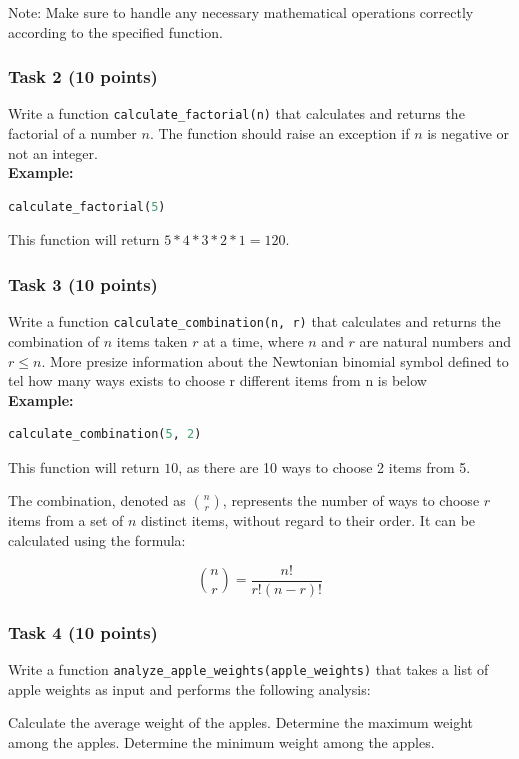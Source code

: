 \documentclass[12pt]{book}
\begin{document}
Note: Make sure to handle any necessary mathematical operations correctly according to the specified function.

\subsubsection{Task 2 (10 points)}
Write a function \texttt{calculate\_factorial(n)} that calculates and returns the factorial of a number $n$. The function should raise an exception if $n$ is negative or not an integer. \\
\textbf{Example:}
\begin{lstlisting}[language=Python]
calculate_factorial(5)
\end{lstlisting}
This function will return $5*4*3*2*1 = 120$.

\subsubsection{Task 3 (10 points)}
Write a function \texttt{calculate\_combination(n, r)} that calculates and returns the combination of $n$ items taken $r$ at a time, where $n$ and $r$ are natural numbers and $r \leq n$. More presize information about the Newtonian binomial symbol defined to tel how many ways exists to choose r different items from n is below \\
\textbf{Example:}
\begin{lstlisting}[language=Python]
calculate_combination(5, 2)
\end{lstlisting}
This function will return $10$, as there are 10 ways to choose 2 items from 5.

The combination, denoted as $\binom{n}{r}$, represents the number of ways to choose $r$ items from a set of $n$ distinct items, without regard to their order. It can be calculated using the formula:

\[
\binom{n}{r} = \frac{n!}{r!(n-r)!}
\]

\subsubsection{Task 4 (10 points)}

Write a function \texttt{analyze\_apple\_weights(apple\_weights)} that takes a list of apple weights as input and performs the following analysis:

    Calculate the average weight of the apples.
    Determine the maximum weight among the apples.
    Determine the minimum weight among the apples.
\end{document}
